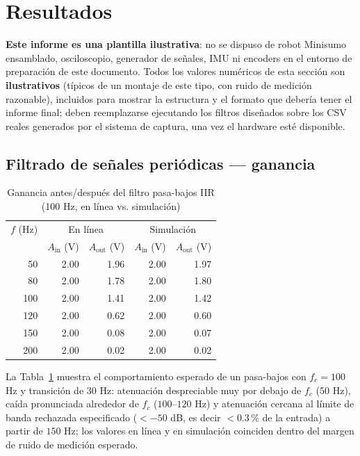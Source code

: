 
\section{Resultados}
\label{sec:resultados}

\textbf{Este informe es una plantilla ilustrativa}: no se dispuso de robot Minisumo ensamblado, osciloscopio, generador de señales, IMU ni encoders en el entorno de preparación de este documento. Todos los valores numéricos de esta sección son \textbf{ilustrativos} (típicos de un montaje de este tipo, con ruido de medición razonable), incluidos para mostrar la estructura y el formato que debería tener el informe final; deben reemplazarse ejecutando los filtros diseñados sobre los CSV reales generados por el sistema de captura, una vez el hardware esté disponible.

\subsection{Filtrado de señales periódicas — ganancia}

\begin{table}[!t]
\centering
\caption{Ganancia antes/después del filtro pasa-bajos IIR (100 Hz, en línea vs. simulación)}
\label{tab:ganancia}
\small
\begin{tabular}{@{}r r r r r@{}}
\toprule
$f$ (Hz) & \multicolumn{2}{c}{En línea} & \multicolumn{2}{c}{Simulación} \\
 & $A_{\text{in}}$ (V) & $A_{\text{out}}$ (V) & $A_{\text{in}}$ (V) & $A_{\text{out}}$ (V) \\
\midrule
50  & 2.00 & 1.96 & 2.00 & 1.97 \\
80  & 2.00 & 1.78 & 2.00 & 1.80 \\
100 & 2.00 & 1.41 & 2.00 & 1.42 \\
120 & 2.00 & 0.62 & 2.00 & 0.60 \\
150 & 2.00 & 0.08 & 2.00 & 0.07 \\
200 & 2.00 & 0.02 & 2.00 & 0.02 \\
\bottomrule
\end{tabular}
\end{table}

La Tabla~\ref{tab:ganancia} muestra el comportamiento esperado de un pasa-bajos con $f_c = 100$ Hz y transición de $30$ Hz: atenuación despreciable muy por debajo de $f_c$ ($50$ Hz), caída pronunciada alrededor de $f_c$ ($100$--$120$ Hz) y atenuación cercana al límite de banda rechazada especificado ($< -50$ dB, es decir $< 0.3\,\%$ de la entrada) a partir de $150$ Hz; los valores en línea y en simulación coinciden dentro del margen de ruido de medición esperado.

